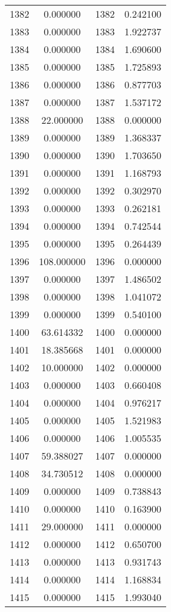 \documentclass[12pt]{article}
\begin{document}
\begin{longtable}{@{}cccc@{}}
1382 & 0.000000 & 1382 & 0.242100 \\
1383 & 0.000000 & 1383 & 1.922737 \\
1384 & 0.000000 & 1384 & 1.690600 \\
1385 & 0.000000 & 1385 & 1.725893 \\
1386 & 0.000000 & 1386 & 0.877703 \\
1387 & 0.000000 & 1387 & 1.537172 \\
1388 & 22.000000 & 1388 & 0.000000 \\
1389 & 0.000000 & 1389 & 1.368337 \\
1390 & 0.000000 & 1390 & 1.703650 \\
1391 & 0.000000 & 1391 & 1.168793 \\
1392 & 0.000000 & 1392 & 0.302970 \\
1393 & 0.000000 & 1393 & 0.262181 \\
1394 & 0.000000 & 1394 & 0.742544 \\
1395 & 0.000000 & 1395 & 0.264439 \\
1396 & 108.000000 & 1396 & 0.000000 \\
1397 & 0.000000 & 1397 & 1.486502 \\
1398 & 0.000000 & 1398 & 1.041072 \\
1399 & 0.000000 & 1399 & 0.540100 \\
1400 & 63.614332 & 1400 & 0.000000 \\
1401 & 18.385668 & 1401 & 0.000000 \\
1402 & 10.000000 & 1402 & 0.000000 \\
1403 & 0.000000 & 1403 & 0.660408 \\
1404 & 0.000000 & 1404 & 0.976217 \\
1405 & 0.000000 & 1405 & 1.521983 \\
1406 & 0.000000 & 1406 & 1.005535 \\
1407 & 59.388027 & 1407 & 0.000000 \\
1408 & 34.730512 & 1408 & 0.000000 \\
1409 & 0.000000 & 1409 & 0.738843 \\
1410 & 0.000000 & 1410 & 0.163900 \\
1411 & 29.000000 & 1411 & 0.000000 \\
1412 & 0.000000 & 1412 & 0.650700 \\
1413 & 0.000000 & 1413 & 0.931743 \\
1414 & 0.000000 & 1414 & 1.168834 \\
1415 & 0.000000 & 1415 & 1.993040 \\

\end{longtable}
\end{document}
